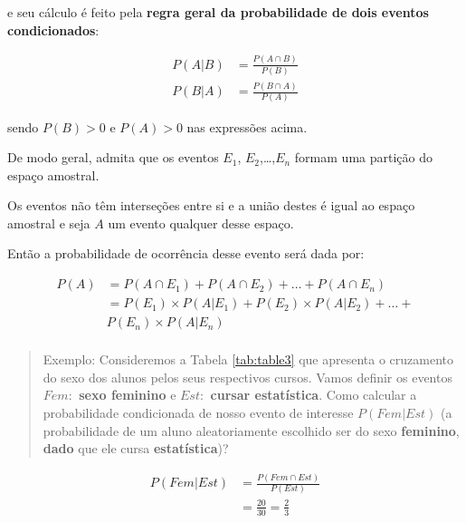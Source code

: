 \documentclass[
]{book}
\begin{document}
\hfill\break

e seu cálculo é feito pela \textbf{regra geral da probabilidade de dois eventos condicionados}:

\hfill\break

\begin{align*}
P(A|B) & = \frac{ P(A\cap B)}{ P(B)} \\
P(B|A) & = \frac{ P(B\cap A)}{ P(A)}
\end{align*}

\hfill\break

sendo \(P(B)>0\) e \(P(A)>0\) nas expressões acima.

\hfill\break

De modo geral, admita que os eventos \(E_{1}\), \(E_{2}\),\ldots,\(E_{n}\) formam uma partição do espaço amostral.

\hfill\break

Os eventos não têm interseções entre si e a união destes é igual ao espaço amostral e seja \(A\) um evento qualquer desse espaço.

\hfill\break

Então a probabilidade de ocorrência desse evento será dada por:

\hfill\break

\begin{align*}
P(A) & = P(A \cap E_{1}) +  P(A \cap E_{2}) + \dots + P(A \cap E_{n}) \\
     & = P(E_{1}) \times P(A|E_{1}) + P(E_{2}) \times P(A|E_{2}) + \dots + \\
     & P(E_{n}) \times P(A|E_{n})\\
\end{align*}

\hfill\break

\begin{quote}
Exemplo: Consideremos a Tabela \ref{tab:table3} que apresenta o cruzamento do sexo dos alunos pelos seus respectivos cursos. Vamos definir os eventos \textbf{\(Fem:\) sexo feminino} e \textbf{\(Est:\) cursar estatística}. Como calcular a probabilidade condicionada de nosso evento de interesse \textbf{\(P(Fem|Est)\)} (a probabilidade de um aluno aleatoriamente escolhido ser do sexo \textbf{feminino}, \textbf{dado} que ele cursa \textbf{estatística})?
\end{quote}

\hfill\break

\begin{align*}
P(Fem|Est) & = \frac{ P(Fem \cap Est)}{ P(Est)} \\
           & = \frac{20}{30} = \frac{2}{3}    
\end{align*}
\end{document}
